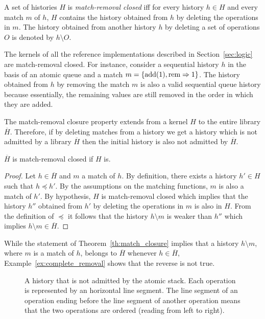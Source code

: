 A set of histories $H$ is \emph{match-removal closed} iff for every history
$h\in H$ and every match $m$ of $h$, $H$ contains the history obtained from $h$
by deleting the operations in $m$. The history obtained from another history
$h$ by deleting a set of operations $O$ is denoted by $h \setminus O$.

The kernels of all the reference implementations described in
Section~\ref{sec:logic} are match-removal closed. For instance, consider a
sequential history $h$ in the basis of an atomic queue and a match $m={\{ 
\text{add}(1), \text{rem}\Rightarrow 1  \}}$. The history obtained from $h$ by
removing the match $m$ is also a valid sequential queue history because
essentially, the remaining values are still removed in the order in which they
are added.

The match-removal closure property extends from a kernel $H$ to the entire
library $\overline{H}$. Therefore, if by deleting matches from a history we get
a history which is not admitted by a library $\overline{H}$ then the initial
history is also not admitted by $\overline{H}$.

\begin{theorem}
  \label{th:match_closure}

  $\overline{H}$ is match-removal closed if $H$ is.

\end{theorem}

\begin{proof}

  Let $h\in \overline{H}$ and $m$ a match of $h$. By definition, there exists a
  history $h'\in H$ such that $h\preceq h'$. By the assumptions on the matching
  functions, $m$ is also a match of $h'$. By hypothesis, $H$ is match-removal
  closed which implies that the history $h''$ obtained from $h'$ by deleting
  the operations in $m$ is also in $H$. From the definition of $\preceq$ it
  follows that the history $h\setminus m$ is weaker than $h''$ which implies
  $h\setminus m\in \overline{H}$.
\end{proof}

While the statement of Theorem~\ref{th:match_closure} implies that a history
$h\setminus m$, where $m$ is a match of $h$, belongs to $\overline{H}$ whenever
$h\in \overline{H}$, Example~\ref{ex:complete_removal} shows that the reverse
is not true.

\begin{figure}

  

  \caption{A history that is not admitted by the atomic stack. Each operation
  is represented by an horizontal line segment. The line segment of an
  operation ending before the line segment of another operation means that the
  two operations are ordered (reading from left to right).}
  \label{fig:complete_removal}

\end{figure}

